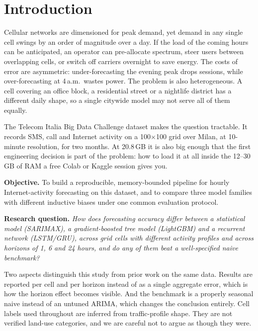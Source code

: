 \documentclass[conference,onecolumn,11pt]{IEEEtran}
\begin{document}
\section{Introduction}
Cellular networks are dimensioned for peak demand, yet demand in any single cell swings by an order of magnitude over a day. If the load of the coming hours can be anticipated, an operator can pre-allocate spectrum, steer users between overlapping cells, or switch off carriers overnight to save energy. The costs of error are asymmetric: under-forecasting the evening peak drops sessions, while over-forecasting at 4\,a.m.\ wastes power. The problem is also heterogeneous. A cell covering an office block, a residential street or a nightlife district has a different daily shape, so a single citywide model may not serve all of them equally.

The Telecom Italia Big Data Challenge dataset \cite{telecomitalia2015,barlacchi2015} makes the question tractable. It records SMS, call and Internet activity on a 100$\times$100 grid over Milan, at 10-minute resolution, for two months. At 20.8\,GB it is also big enough that the first engineering decision is part of the problem: how to load it at all inside the 12--30\,GB of RAM a free Colab or Kaggle session gives you.

\textbf{Objective.} To build a reproducible, memory-bounded pipeline for hourly Internet-activity forecasting on this dataset, and to compare three model families with different inductive biases under one common evaluation protocol.

\textbf{Research question.} \emph{How does forecasting accuracy differ between a statistical model (SARIMAX), a gradient-boosted tree model (LightGBM) and a recurrent network (LSTM/GRU), across grid cells with different activity profiles and across horizons of 1, 6 and 24 hours, and do any of them beat a well-specified naive benchmark?}

Two aspects distinguish this study from prior work on the same data. Results are reported per cell and per horizon instead of as a single aggregate error, which is how the horizon effect becomes visible. And the benchmark is a properly seasonal naive instead of an untuned ARIMA, which changes the conclusion entirely. Cell labels used throughout are inferred from traffic-profile shape. They are not verified land-use categories, and we are careful not to argue as though they were.

\end{document}
